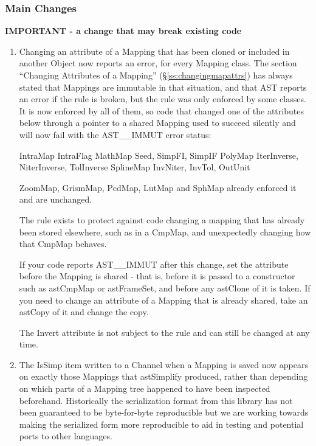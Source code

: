 \documentclass[twoside,11pt]{starlink}
\providecommand{\secref}[1]{\S\ref{#1}}
\begin{document}
\subsubsection{Main Changes}

\textbf{IMPORTANT - a change that may break existing code}

\begin{enumerate}
\item Changing an attribute of a Mapping that has been cloned or included in another Object now reports an error, for every Mapping class.
  The section ``Changing Attributes of a Mapping'' (\secref{ss:changingmapattrs}) has always stated that Mappings are immutable in that situation, and that AST reports an error if the rule is broken, but the rule was only enforced by some classes.
  It is now enforced by all of them, so code that changed one of the attributes below through a pointer to a shared Mapping used to succeed silently and will now fail with the AST\_\_IMMUT error status:

\begin{terminalv}
IntraMap    IntraFlag
MathMap     Seed, SimpFI, SimpIF
PolyMap     IterInverse, NiterInverse, TolInverse
SplineMap   InvNiter, InvTol, OutUnit
\end{terminalv}

  ZoomMap, GrismMap, PcdMap, LutMap and SphMap already enforced it and are unchanged.

  The rule exists to protect against code changing a mapping that has already been stored elsewhere, such as in a CmpMap, and unexpectedly changing how that CmpMap behaves.

  If your code reports AST\_\_IMMUT after this change, set the attribute before the Mapping is shared - that is, before it is passed to a constructor such as astCmpMap or astFrameSet, and before any astClone of it is taken.
  If you need to change an attribute of a Mapping that is already shared, take an astCopy of it and change the copy.

  The Invert attribute is not subject to the rule and can still be changed at any time.
\item The IsSimp item written to a Channel when a Mapping is saved now appears on exactly those Mappings that astSimplify produced, rather than depending on which parts of a Mapping tree happened to have been inspected beforehand.
  Historically the serialization format from this library has not been guaranteed to be byte-for-byte reproducible but we are working towards making the serialized form more reproducible to aid in testing and potential ports to other languages.
\end{enumerate}
\end{document}
